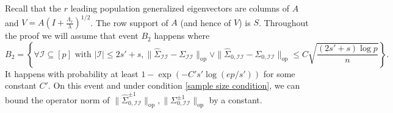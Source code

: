 \documentclass[11pt]{article}
\newcommand{\nb}[1]{\textcolor{orange}{\texttt{[#1]}}}
\newcommand{\scale}{V}
\newcommand{\cI}{{\mathcal{I}}}
\newcommand{\0}{{\mathbf{0}}}
\newcommand{\op}{{\mathrm{op}}}
\begin{document}
\iffalse
Recall that the $r$  leading population generalized eigenvectors are columns of $A$ and $\scale=A(I+\frac{\Lambda_r}{\lambda})^{1/2}$.
The row support of $A$ (and hence of $V$) is $S$. 
Throughout the proof we will assume that event $B_2$ happens where 
\begin{equation*}
B_2 = 
\left\{ \forall\text{$\cI\subseteq [p]$ with $|\cI|\leq 2s'+s,
\|\widehat{\Sigma}_{\cI\cI}-\Sigma_{\cI\cI}\|_{\mathrm{op}}\vee
\|\widehat{\Sigma}_{0,\cI\cI}-\Sigma_{0,\cI\cI}\|_{\mathrm{op}}
\leq C\sqrt{\frac{(2s'+s)\log p}{n}}$}
\right \}.
\end{equation*}
It happens with probability at least $1-\exp(-C's'\log(ep/s'))$ for some constant $C'$. 
On this event and under condition \eqref{sample size condition}, we can bound the operator norm of $\|\widehat{\Sigma}_{0,\cI\cI}^{\pm 1}\|_{\op}, \|\Sigma_{0,\cI\cI}^{\pm 1}\|_{\op}$ by a constant.
\end{document}
